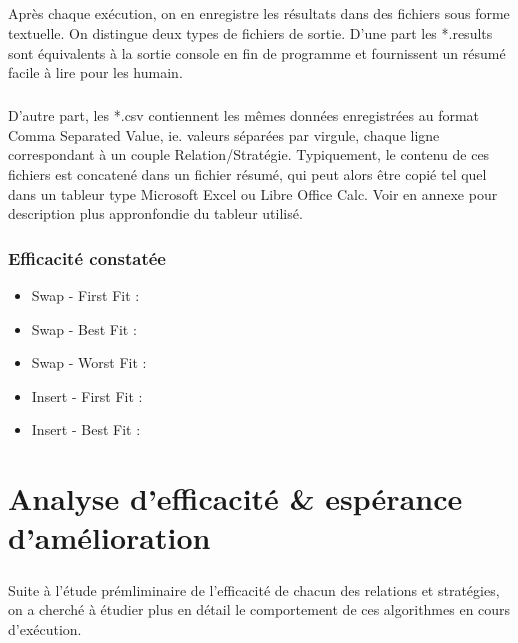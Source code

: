 \documentclass[a4paper,10pt]{report}
\begin{document}
\paragraph{}
  Après chaque exécution, on en enregistre les résultats dans des fichiers sous forme textuelle. On distingue deux
types de fichiers de sortie. D'une part les *.results sont équivalents à la sortie console en fin de programme et
fournissent un résumé facile à lire pour les humain.
\paragraph{}
  D'autre part, les *.csv contiennent les mêmes données enregistrées au format Comma Separated Value, ie. valeurs
séparées par virgule, chaque ligne correspondant à un couple Relation/Stratégie. Typiquement, le contenu de ces 
fichiers est concatené dans un fichier résumé, qui peut alors être copié tel quel dans un tableur type Microsoft
Excel ou Libre Office Calc. Voir en annexe pour description plus appronfondie du tableur utilisé.
  

\subsection{Efficacité constatée}
\begin{itemize}
 \item Swap - First Fit : 
 \item Swap - Best Fit : 
 \item Swap - Worst Fit : 
 \item Insert - First Fit :
 \item Insert - Best Fit :
\end{itemize}


\chapter{Analyse d'efficacité \& espérance d'amélioration}

\paragraph{}
  Suite à l'étude prémliminaire de l'efficacité de chacun des relations et stratégies, on a cherché à étudier
plus en détail le comportement de ces algorithmes en cours d'exécution.
\end{document}
